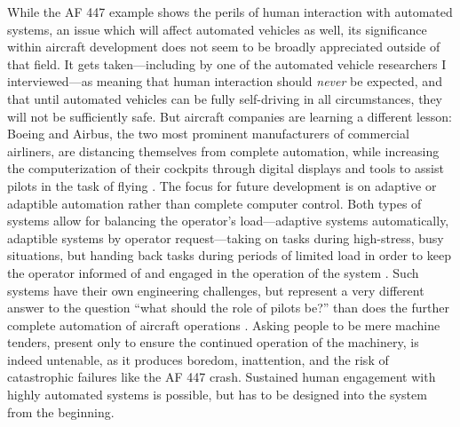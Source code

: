 While the AF 447 example shows the
perils of human interaction with automated systems, an issue which will
affect automated vehicles as well, its significance
within aircraft development does not seem to be broadly appreciated
outside of that field. It gets taken---including by one of the
automated vehicle researchers I interviewed---as meaning that human
interaction should \emph{never} be expected, and that until automated
vehicles can be fully self-driving in all circumstances, they will not
be sufficiently safe. %
But aircraft companies are learning a
different lesson: Boeing and Airbus, the two
most prominent manufacturers of commercial airliners, are distancing
themselves from complete automation, while increasing the computerization of
their cockpits through digital displays and tools to assist pilots in
the task of flying \cite{787dream} \cite{brownFuture}. The focus for
future development is on adaptive or adaptible automation
rather than complete computer control. Both types of systems allow for
balancing the operator's load---adaptive systems automatically,
adaptible systems by operator request---taking on tasks during
high-stress, busy situations, but handing back tasks during periods of
limited load in order to keep the operator informed of and engaged in
the operation of the system \cite{dahai}. Such systems have their own
engineering challenges, but represent a very different answer to the
question ``what should the role of pilots be?'' than does the further
complete automation of aircraft operations \cite{kaber}. Asking people to be mere machine
tenders, present only to ensure the continued operation of the
machinery, is indeed untenable, as it produces boredom,
inattention, and the risk of catastrophic failures like the AF 447
crash. Sustained human engagement
with highly automated systems is possible, but has to be designed into
the system from the beginning.%

